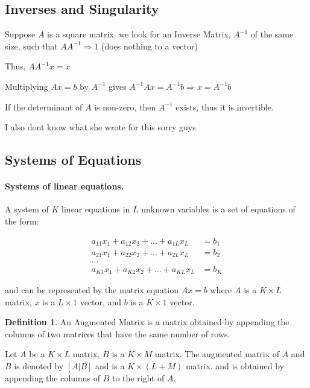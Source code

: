 \documentclass{article}
\theoremstyle{definition}
\newtheorem{definition}[theorem]{Definition}
\theoremstyle{remark}
\begin{document}
\subsection{Inverses and Singularity}

Suppose $A$ is a square matrix. we look for an Inverse Matrix, $A^{-1}$ of the same size, such that $AA^{-1} \Rightarrow 1$ (does nothing to a vector) 

Thus, $AA^{-1}x = x$

Multiplying $Ax = b$ by $A^{-1}$ gives $A^{-1}Ax = A^{-1}b \Rightarrow x = A^{-1}b$

If the determinant of $A$ is non-zero, then $A^{-1}$ exists, thus it is invertible. 

\bigskip
\bigskip
\bigskip

I also dont know what she wrote for this sorry guys 

\subsection{Systems of Equations}

\paragraph{Systems of linear equations.} 

A system of $K$ linear equations in $L$ unknown variables is a set of equations of the form:

\begin{align*}
    a_{11}x_1 + a_{12}x_2 + ... + a_{1L}x_L &= b_1 \\
    a_{21}x_1 + a_{22}x_2 + ... + a_{2L}x_L &= b_2 \\
    ... \\
    a_{K1}x_1 + a_{K2}x_2 + ... + a_{KL}x_L &= b_K
\end{align*}

and can be represented by the matrix equation $Ax = b$ where $A$ is a $K \times L$ matrix, $x$ is a $L \times 1$ vector, and $b$ is a $K \times 1$ vector.

\begin{definition}
    An Augmented Matrix is a matrix obtained by appending the columns of two matrices that have the same number of rows.
\end{definition}

Let $A$ be a $K \times L$ matrix, $B$ is a $K \times M$ matrix. The augmented matrix of $A$ and $B$ is denoted by $[A|B]$ and is a $K \times (L+M)$ matrix. and is obtained by appending the columns of $B$ to the right of $A$. 
\end{document}
